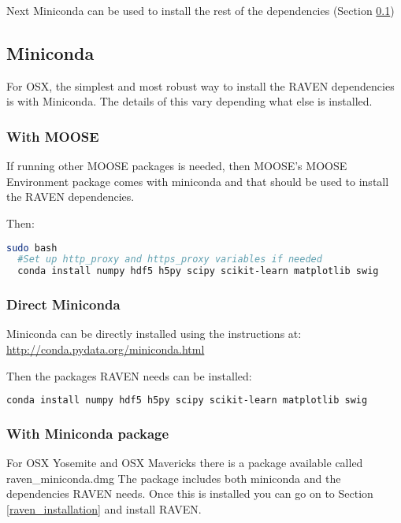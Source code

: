 Next Miniconda can be used to install the rest of the dependencies
(Section \ref{miniconda})


\subsection{Miniconda}
\label{miniconda}

For OSX, the simplest and most robust way to install the RAVEN dependencies
is with Miniconda.  The details of this vary depending what else is
installed.

\subsubsection{With MOOSE}
\label{miniconda_moose}

If running other MOOSE packages is needed, then MOOSE's MOOSE
Environment package comes with miniconda and that should be used to
install the RAVEN dependencies.

Then:
\begin{lstlisting}[language=bash]
  sudo bash
  #Set up http_proxy and https_proxy variables if needed
  conda install numpy hdf5 h5py scipy scikit-learn matplotlib swig
\end{lstlisting}

\goToRavenInstallation

\subsubsection{Direct Miniconda}

Miniconda can be directly installed using the instructions at: \url{http://conda.pydata.org/miniconda.html}

Then the packages RAVEN needs can be installed:
\begin{lstlisting}[language=bash]
  conda install numpy hdf5 h5py scipy scikit-learn matplotlib swig
\end{lstlisting}

\goToRavenInstallation

\subsubsection{With Miniconda package}

For OSX Yosemite and OSX Mavericks there is a package available called
raven\_miniconda.dmg The package includes both miniconda and the
dependencies RAVEN needs.  Once this is installed you can go on to Section \ref{raven_installation} and install RAVEN.


